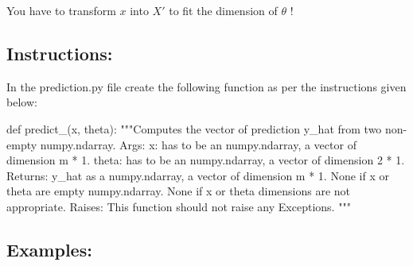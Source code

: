 \documentclass[]{article}
\newenvironment{Shaded}{\begin{snugshade}}{\end{snugshade}}
\newcommand{\CommentTok}[1]{\textcolor[rgb]{0.48,0.49,0.49}{#1}}
\newcommand{\KeywordTok}[1]{\textcolor[rgb]{0.81,0.81,0.76}{#1}}
\newcommand{\NormalTok}[1]{\textcolor[rgb]{0.81,0.81,0.76}{#1}}
\begin{document}
You have to transform \(x\) into \(X'\) to fit the dimension of
\(\theta\) !

\hypertarget{instructions-2}{%
\subsection{Instructions:}\label{instructions-2}}

In the prediction.py file create the following function as per the
instructions given below:

\begin{Shaded}
\begin{Highlighting}[]
\KeywordTok{def}\NormalTok{ predict_(x, theta):}
    \CommentTok{"""Computes the vector of prediction y_hat from two non-empty numpy.ndarray.}
\CommentTok{    Args:}
\CommentTok{      x: has to be an numpy.ndarray, a vector of dimension m * 1.}
\CommentTok{      theta: has to be an numpy.ndarray, a vector of dimension 2 * 1.}
\CommentTok{    Returns:}
\CommentTok{      y_hat as a numpy.ndarray, a vector of dimension m * 1.}
\CommentTok{      None if x or theta are empty numpy.ndarray.}
\CommentTok{      None if x or theta dimensions are not appropriate.}
\CommentTok{    Raises:}
\CommentTok{      This function should not raise any Exceptions.}
\CommentTok{    """}
\end{Highlighting}
\end{Shaded}

\hypertarget{examples-3}{%
\subsection{Examples:}\label{examples-3}}
\end{document}
